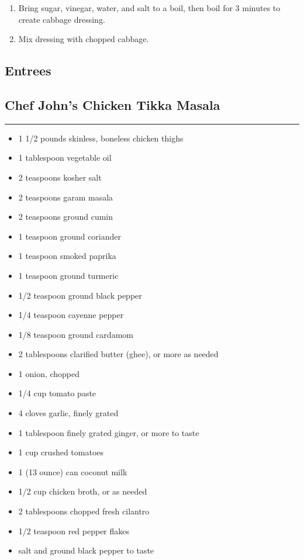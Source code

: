 \documentclass{article}
\begin{document}
\begin{enumerate}
    \item 
        Bring sugar, vinegar, water, and salt to a boil, then boil for 3 minutes to create cabbage dressing.
    \item 
        Mix dressing with chopped cabbage.
\end{enumerate}
\newpage

\vspace*{\fill}
\begin{center}
    \section{Entrees}
\end{center}
\vspace*{\fill}
\newpage

\subsection{Chef John's Chicken Tikka Masala} 
\noindent\rule[0.5ex]{\linewidth}{1pt}

\begin{framed}
\begin{itemize}
    \item 1 1/2 pounds skinless, boneless chicken thighs
    \item 1 tablespoon vegetable oil
    \item 2 teaspoons kosher salt
    \item 2 teaspoons garam masala
    \item 2 teaspoons ground cumin
    \item 1 teaspoon ground coriander
    \item 1 teaspoon smoked paprika
    \item 1 teaspoon ground turmeric
    \item 1/2 teaspoon ground black pepper
    \item 1/4 teaspoon cayenne pepper
    \item 1/8 teaspoon ground cardamom
    \item 2 tablespoons clarified butter (ghee), or more as needed
    \item 1 onion, chopped
    \item 1/4 cup tomato paste
    \item 4 cloves garlic, finely grated
    \item 1 tablespoon finely grated ginger, or more to taste
    \item 1 cup crushed tomatoes
    \item 1 (13 ounce) can coconut milk
    \item 1/2 cup chicken broth, or as needed
    \item 2 tablespoons chopped fresh cilantro
    \item 1/2 teaspoon red pepper flakes
    \item salt and ground black pepper to taste
\end{itemize}
\end{framed}
\end{document}

